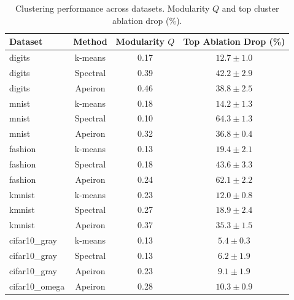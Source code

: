 \begin{table}[htbp]
\centering
\caption{Clustering performance across datasets. Modularity $Q$ and top cluster ablation drop (\%).}
\label{tab:all_experiments}
\begin{tabular}{l c c c}
\toprule
\textbf{Dataset} & \textbf{Method} & \textbf{Modularity $Q$} & \textbf{Top Ablation Drop (\%)} \\
\midrule
digits & k-means & 0.17 & $12.7 \pm 1.0$ \\
digits & Spectral & 0.39 & $42.2 \pm 2.9$ \\
digits & Apeiron & 0.46 & $38.8 \pm 2.5$ \\
\midrule
mnist & k-means & 0.18 & $14.2 \pm 1.3$ \\
mnist & Spectral & 0.10 & $64.3 \pm 1.3$ \\
mnist & Apeiron & 0.32 & $36.8 \pm 0.4$ \\
\midrule
fashion & k-means & 0.13 & $19.4 \pm 2.1$ \\
fashion & Spectral & 0.18 & $43.6 \pm 3.3$ \\
fashion & Apeiron & 0.24 & $62.1 \pm 2.2$ \\
\midrule
kmnist & k-means & 0.23 & $12.0 \pm 0.8$ \\
kmnist & Spectral & 0.27 & $18.9 \pm 2.4$ \\
kmnist & Apeiron & 0.37 & $35.3 \pm 1.5$ \\
\midrule
cifar10_gray & k-means & 0.13 & $5.4 \pm 0.3$ \\
cifar10_gray & Spectral & 0.13 & $6.2 \pm 1.9$ \\
cifar10_gray & Apeiron & 0.23 & $9.1 \pm 1.9$ \\
\midrule
cifar10_omega & Apeiron & 0.28 & $10.3 \pm 0.9$ \\
\bottomrule
\end{tabular}
\end{table}